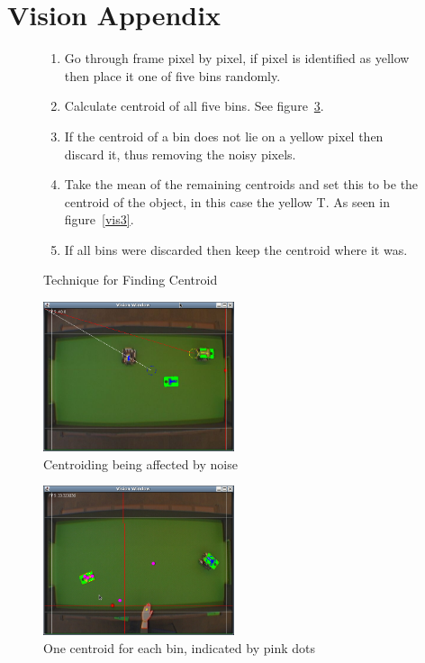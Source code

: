\section{Vision Appendix}
\label{apx:vision}

\begin{figure}[h!]
    \caption{Technique for Finding Centroid}
    \label{bins}
    \centering
        \begin{enumerate}
            \item Go through frame pixel by pixel, if pixel is identified as yellow then place it one of five bins randomly.
            \item Calculate centroid of all five bins. See figure~\ref{vis2}.
            \item If the centroid of a bin does not lie on a yellow pixel then discard it, thus removing the noisy pixels.
            \item Take the mean of the remaining centroids and set this to be the centroid of the object, in this case the yellow T.  As seen in figure~\ref{vis3}.
            \item If all bins were discarded then keep the centroid where it was.
        \end{enumerate}
\end{figure}

\begin{figure}[h!]
  \caption{Centroiding being affected by noise}
  \label{vis1}
  \centering
    \includegraphics[width=0.5\textwidth]{randy_bins_before.png}
\end{figure}

\begin{figure}[h!]
  \caption{One centroid for each bin, indicated by pink dots}
  \label{vis2}
  \centering
    \includegraphics[width=0.5\textwidth]{randy_bins_after_mult.png}
\end{figure}

